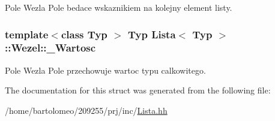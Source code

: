 Pole Wezla Pole bedace wskaznikiem na kolejny element listy. 

\hypertarget{struct_lista_1_1_wezel_a5873e379887a28a814be35810883e743}{
\subsubsection[{\-\_\-\-Wartosc}]{\setlength{\rightskip}{0pt plus 5cm}template$<$class Typ $>$ Typ {\bf Lista}$<$ Typ $>$\-::Wezel\-::\-\_\-\-Wartosc}}\label{struct_lista_1_1_wezel_a5873e379887a28a814be35810883e743}


Pole Wezla Pole przechowuje wartoc typu calkowitego. 



The documentation for this struct was generated from the following file\-:\begin{DoxyCompactItemize}
\item 
/home/bartolomeo/209255/prj/inc/\hyperlink{_lista_8hh}{Lista.\-hh}\end{DoxyCompactItemize}
